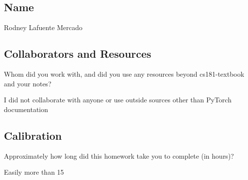 \documentclass[submit]{harvardml}
\begin{document}
\newpage
\subsection*{Name}
Rodney Lafuente Mercado

\subsection*{Collaborators and Resources}
Whom did you work with, and did you use any resources beyond cs181-textbook and your notes?

I did not collaborate with anyone or use outside sources other than PyTorch documentation
\subsection*{Calibration}
Approximately how long did this homework take you to complete (in hours)? 

Easily more than 15
\end{document}
